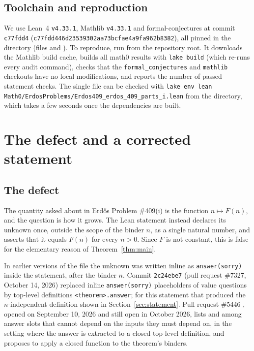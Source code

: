 \documentclass[11pt]{amsart}
\theoremstyle{plain}
\theoremstyle{definition}
\begin{document}
\subsection*{Toolchain and reproduction}
We use Lean~4 \cite{Lean4} \texttt{v4.33.1}, Mathlib \cite{Mathlib} \texttt{v4.33.1} and formal-conjectures \cite{FC} at commit \texttt{c77fdd4} (\texttt{c77fdd446d23539302aa73bcfae4a9fa962b8382}), all pinned in the  directory (files  and ). To reproduce, run  from the repository root. It downloads the Mathlib build cache, builds all math0 results with \texttt{lake build} (which re-runs every audit command), checks that the \texttt{formal\_conjectures} and \texttt{mathlib} checkouts have no local modifications, and reports the number of passed statement checks. The single file can be checked with \texttt{lake env lean Math0/ErdosProblems/Erdos409\_erdos\_409\_parts\_i.lean} from the  directory, which takes a few seconds once the dependencies are built.

\section{The defect and a corrected statement}\label{sec:defect}

\subsection*{The defect}
The quantity asked about in Erd\H{o}s Problem \#409(i) is the function $n\mapsto F(n)$, and the question is how it grows. The Lean statement  instead declares its unknown  once, outside the scope of the binder $n$, as a single natural number, and asserts that it equals $F(n)$ for every $n>0$. Since $F$ is not constant, this is false for the elementary reason of Theorem~\ref{thm:main}.

In earlier versions of the file the unknown was written inline as \texttt{answer(sorry)} inside the statement, after the binder $n$. Commit \texttt{2c24ebe7} (pull request \#7327, October 14, 2026) replaced inline \texttt{answer(sorry)} placeholders of value questions by top-level definitions \texttt{<theorem>.answer}; for this statement that produced the $n$-independent definition shown in Section~\ref{sec:statement}. Pull request \#5446 \cite{PR5446}, opened on September 10, 2026 and still open in October 2026, lists  and  among answer slots that cannot depend on the inputs they must depend on, in the setting where the answer is extracted to a closed top-level definition, and proposes to apply a closed function to the theorem's binders.
\end{document}
